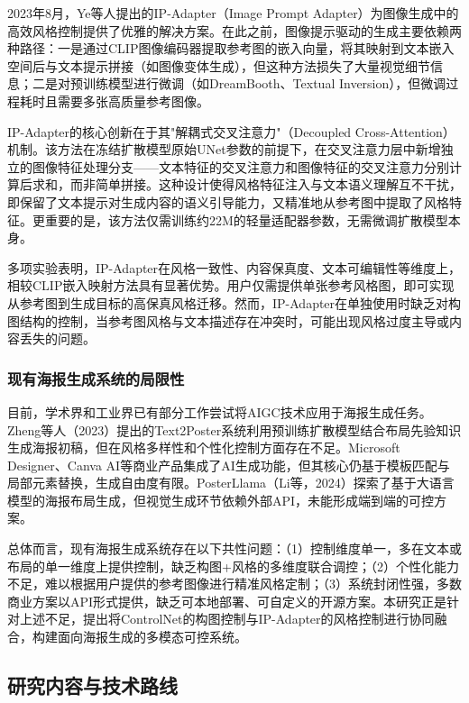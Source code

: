 \documentclass[12pt,a4paper]{ctexart}
\newcommand{\controlnet}{ControlNet}
\newcommand{\ipadapter}{IP-Adapter}
\begin{document}
2023年8月，Ye等人提出的\ipadapter{}（Image Prompt Adapter）为图像生成中的高效风格控制提供了优雅的解决方案。在此之前，图像提示驱动的生成主要依赖两种路径：一是通过CLIP图像编码器提取参考图的嵌入向量，将其映射到文本嵌入空间后与文本提示拼接（如图像变体生成），但这种方法损失了大量视觉细节信息；二是对预训练模型进行微调（如DreamBooth、Textual Inversion），但微调过程耗时且需要多张高质量参考图像。

\ipadapter{}的核心创新在于其"解耦式交叉注意力"（Decoupled Cross-Attention）机制。该方法在冻结扩散模型原始UNet参数的前提下，在交叉注意力层中新增独立的图像特征处理分支——文本特征的交叉注意力和图像特征的交叉注意力分别计算后求和，而非简单拼接。这种设计使得风格特征注入与文本语义理解互不干扰，即保留了文本提示对生成内容的语义引导能力，又精准地从参考图中提取了风格特征。更重要的是，该方法仅需训练约22M的轻量适配器参数，无需微调扩散模型本身。

多项实验表明，\ipadapter{}在风格一致性、内容保真度、文本可编辑性等维度上，相较CLIP嵌入映射方法具有显著优势。用户仅需提供单张参考风格图，即可实现从参考图到生成目标的高保真风格迁移。然而，\ipadapter{}在单独使用时缺乏对构图结构的控制，当参考图风格与文本描述存在冲突时，可能出现风格过度主导或内容丢失的问题。

\subsubsection{现有海报生成系统的局限性}

目前，学术界和工业界已有部分工作尝试将AIGC技术应用于海报生成任务。Zheng等人（2023）提出的Text2Poster系统利用预训练扩散模型结合布局先验知识生成海报初稿，但在风格多样性和个性化控制方面存在不足。Microsoft Designer、Canva AI等商业产品集成了AI生成功能，但其核心仍基于模板匹配与局部元素替换，生成自由度有限。PosterLlama（Li等，2024）探索了基于大语言模型的海报布局生成，但视觉生成环节依赖外部API，未能形成端到端的可控方案。

总体而言，现有海报生成系统存在以下共性问题：（1）控制维度单一，多在文本或布局的单一维度上提供控制，缺乏构图+风格的多维度联合调控；（2）个性化能力不足，难以根据用户提供的参考图像进行精准风格定制；（3）系统封闭性强，多数商业方案以API形式提供，缺乏可本地部署、可自定义的开源方案。本研究正是针对上述不足，提出将\controlnet{}的构图控制与\ipadapter{}的风格控制进行协同融合，构建面向海报生成的多模态可控系统。

\subsection{研究内容与技术路线}
\end{document}
